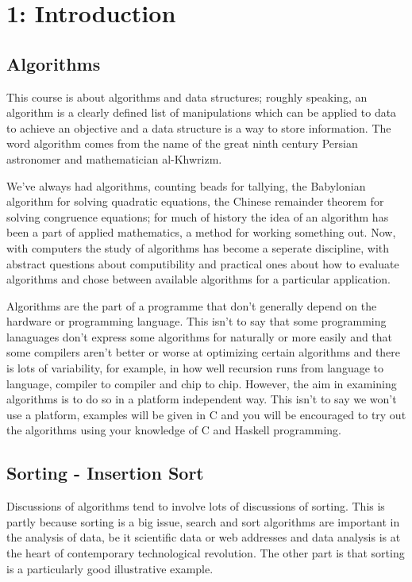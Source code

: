 \documentclass[11pt,a4paper]{scrartcl}
\begin{document}
\section*{1: Introduction}

\subsection*{Algorithms}

This course is about algorithms and data structures; roughly speaking,
an algorithm is a clearly defined list of manipulations which can be
applied to data to achieve an objective and a data structure is a way
to store information. The word algorithm comes from the name of the
great ninth century Persian astronomer and mathematician
al-Khwrizm. 

We've always had algorithms, counting beads for tallying, the
Babylonian algorithm for solving quadratic equations, the Chinese
remainder theorem for solving congruence equations; for much of
history the idea of an algorithm has been a part of applied
mathematics, a method for working something out. Now, with computers
the study of algorithms has become a seperate discipline, with
abstract questions about computibility and practical ones about how to
evaluate algorithms and chose between available algorithms for a
particular application.

Algorithms are the part of a programme that don't generally depend
on the hardware or programming language. This isn't to say that some
programming lanaguages don't express some algorithms for naturally or
more easily and that some compilers aren't better or worse at
optimizing certain algorithms and there is lots of variability, for
example, in how well recursion runs from language to language,
compiler to compiler and chip to chip. However, the aim in examining
algorithms is to do so in a platform independent way. This isn't to
say we won't use a platform, examples will be given in C and you will
be encouraged to try out the algorithms using your knowledge of C and
Haskell programming.

\subsection*{Sorting - Insertion Sort}

Discussions of algorithms tend to involve lots of discussions of
sorting. This is partly because sorting is a big issue, search and
sort algorithms are important in the analysis of data, be it
scientific data or web addresses and data analysis is at the heart of
contemporary technological revolution. The other part is that sorting
is a particularly good illustrative example.
\end{document}
